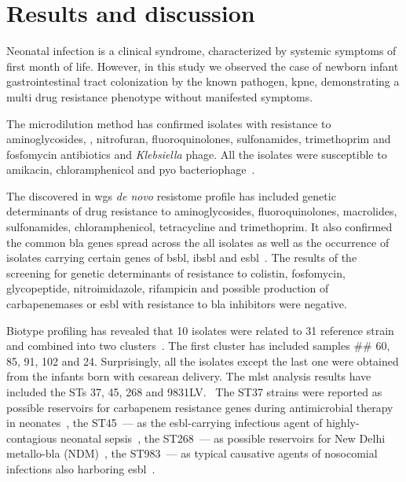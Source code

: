 \section{Results and discussion}\label{sec:res_dis}
Neonatal infection is a clinical syndrome, characterized by systemic symptoms of first month of life.
However, in this study we observed the case of newborn infant gastrointestinal tract colonization by the known
pathogen, \gls{kpne}, demonstrating a multi drug resistance phenotype without manifested symptoms.

The microdilution method has confirmed isolates with resistance to aminoglycosides, \betalactam,
nitrofuran, fluoroquinolones, sulfonamides, trimethoprim and fosfomycin antibiotics and \textit{Klebsiella} phage.
All the isolates were susceptible to amikacin, chloramphenicol and pyo bacteriophage~.

The discovered in \gls{wgs} \textit{de novo} resistome profile has included genetic determinants of drug resistance to
aminoglycosides, fluoroquinolones, macrolides, sulfonamides, chloramphenicol, tetracycline and trimethoprim.
It also confirmed the common \gls{bla} genes spread across the all isolates as well as the occurrence of isolates
carrying certain genes of \gls{bsbl}, \gls{ibsbl} and \gls{esbl}~.
The results of the screening for genetic determinants of resistance to colistin, fosfomycin, glycopeptide,
nitroimidazole, rifampicin and possible production of carbapenemases or \gls{esbl} with resistance to \gls{bla}
inhibitors were negative.

Biotype profiling has revealed that 10 isolates were related to 31 reference strain and combined into two
clusters~.
The first cluster has included samples \#\# 60, 85, 91, 102 and 24.
Surprisingly, all the isolates except the last one were obtained from the infants born with cesarean delivery.
The \gls{mlst} analysis results have included the STs 37, 45, 268 and 983\-1LV.~
The ST37 strains were reported as possible reservoirs for carbapenem resistance genes during antimicrobial therapy
in neonates~\cite{Li2017}, the ST45~--- as the \gls{esbl}-carrying infectious agent of highly-contagious
neonatal sepsis~\cite{Marando2018}, the ST268~--- as possible reservoirs for New Delhi metallo-\gls{bla}
(NDM)~\cite{Kiaei2019}, the ST983~--- as typical causative agents of nosocomial infections
also harboring \gls{esbl}~\cite{Founou2019}.

